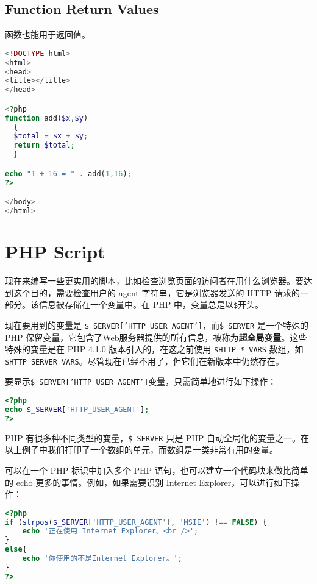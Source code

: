 \section{Function Return Values}

函数也能用于返回值。

\begin{lstlisting}[language=PHP]
<!DOCTYPE html>
<html>
<head>
<title></title>
</head>

<?php
function add($x,$y)
  {
  $total = $x + $y;
  return $total;
  }

echo "1 + 16 = " . add(1,16);
?>

</body>
</html>
\end{lstlisting}




\chapter{PHP Script}


现在来编写一些更实用的脚本，比如检查浏览页面的访问者在用什么浏览器。要达到这个目的，需要检查用户的 agent 字符串，它是浏览器发送的 HTTP 请求的一部分。该信息被存储在一个变量中。在 PHP 中，变量总是以\texttt{\$}开头。

现在要用到的变量是 \texttt{\$\_SERVER['HTTP\_USER\_AGENT']}，而\texttt{\$\_SERVER} 是一个特殊的 PHP 保留变量，它包含了Web服务器提供的所有信息，被称为\textbf{超全局变量}。这些特殊的变量是在 PHP 4.1.0 版本引入的，在这之前使用 \texttt{\$HTTP\_*\_VARS} 数组，如 \texttt{\$HTTP\_SERVER\_VARS}。尽管现在已经不用了，但它们在新版本中仍然存在。

要显示\texttt{\$\_SERVER['HTTP\_USER\_AGENT']}变量，只需简单地进行如下操作：

\begin{lstlisting}[language=PHP]
<?php 
echo $_SERVER['HTTP_USER_AGENT']; 
?>
\end{lstlisting}

PHP 有很多种不同类型的变量，\texttt{\$\_SERVER} 只是 PHP 自动全局化的变量之一。在以上例子中我们打印了一个数组的单元，而数组是一类非常有用的变量。

可以在一个 PHP 标识中加入多个 PHP 语句，也可以建立一个代码块来做比简单的 echo 更多的事情。例如，如果需要识别 Internet Explorer，可以进行如下操作：


\begin{lstlisting}[language=PHP]
<?php
if (strpos($_SERVER['HTTP_USER_AGENT'], 'MSIE') !== FALSE) {
    echo '正在使用 Internet Explorer。<br />';
}
else{
    echo '你使用的不是Internet Explorer。';
}
?>
\end{lstlisting}

